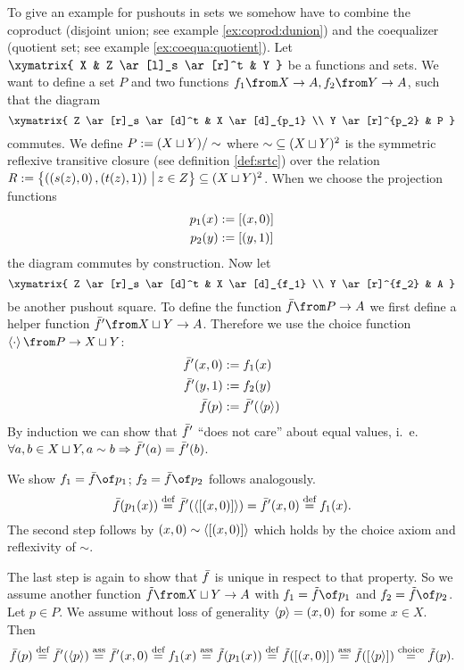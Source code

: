 \begin{example}
  \label{ex:pushout:set}
  To give an example for pushouts in sets we somehow have to combine the coproduct (disjoint union; see example \ref{ex:coprod:dunion}) and the coequalizer (quotient set; see example \ref{ex:coequa:quotient}).
  Let
  $ \xymatrix{
    X & Z \ar[l]_s \ar[r]^t & Y
  } $
  be a functions and sets.
  We want to define a set $P$ and two functions $f_1 \from X \to A, f_2 \from Y \to A$, such that the diagram
  \[ \xymatrix{
    Z \ar[r]_s \ar[d]^t & X \ar[d]_{p_1} \\
    Y \ar[r]^{p_2} & P
  } \]
  commutes.
  We define $P := (X \sqcup Y) / \sim$ where $\sim \; \subseteq (X \sqcup Y)^2$ is the symmetric reflexive transitive closure (see definition \ref{def:srtc}) over the relation
  $R := \bigl \{ \left( \left( s(z) , 0 \right) , \left( t(z) , 1 \right) \right) \,\big|\, z \in Z \bigr \} \subseteq (X \sqcup Y)^2$.
  When we choose the projection functions
  \begin{alignat*}{2}
    p_1(x) &:= \left[ \left( x , 0 \right) \right] \\
    p_2(y) &:= \left[ \left( y , 1 \right) \right]
  \end{alignat*}
  the diagram commutes by construction. Now let
  \[ \xymatrix{
    Z \ar[r]_s \ar[d]^t & X \ar[d]_{f_1} \\
    Y \ar[r]^{f_2} & A
  } \]
  be another pushout square. To define the function $\fbar \from P \to A$ we first define a helper function $\fbar' \from X \dunion Y \to A$.
  Therefore we use the choice function
  $\choice \cdot \from P \to X \dunion Y$:
  \begin{alignat*}{2}
    \bar{f}'(x, 0) &:= f_1(x) \\
    \bar{f}'(y, 1) &:= f_2(y) \\
    \bar{f}(p)     &:= \bar{f}'(\left< p \right>)
  \end{alignat*}
  By induction we can show that $\bar{f}'$ ``does not care'' about equal values, i.~e. $\forall a,b \in X \sqcup Y, a \sim b \Rightarrow \bar{f}'(a) = \bar{f}'(b)$.

  We show $f_1 = \fbar \of p_1$; $f_2 = \fbar \of p_2$ follows analogously.
  $$\bar{f}(p_1(x)) \stackrel{\text{def}}{=} \bar{f}'(\left< \left[ \left( x , 0 \right) \right] \right>) = \bar{f}'(x, 0) \stackrel{\text{def}}{=} f_1(x).$$
  The second step follows by $\left( x , 0 \right) \sim \left< \left[ \left( x , 0 \right) \right] \right>$ which holds by the choice axiom and reflexivity of $\sim$.

  The last step is again to show that $\bar{f}$ is unique in respect to that property. So we assume another function $\ftilde \from X \dunion Y \to A$ with $f_1 = \ftilde \of p_1$ and $f_2 = \ftilde \of p_2$.
  Let $p \in P$. We assume without loss of generality $\left< p \right> = \left( x , 0 \right)$ for some $x \in X$. Then
  $$\bar{f}(p)
    \stackrel{\text{def}}{=} \bar{f}'(\left< p \right>)
    \stackrel{\text{ass}}{=} \bar{f}'(x, 0)
    \stackrel{\text{def}}{=} f_1(x)
    \stackrel{\text{ass}}{=} \tilde{f}(p_1(x)) \stackrel{\text{def}}{=} \tilde{f}(\left[ \left( x , 0 \right) \right])
    \stackrel{\text{ass}}{=} \tilde{f}(\left[ \left< p \right> \right])
    \stackrel{\text{choice}}{=} \tilde{f}(p).$$
\end{example}

